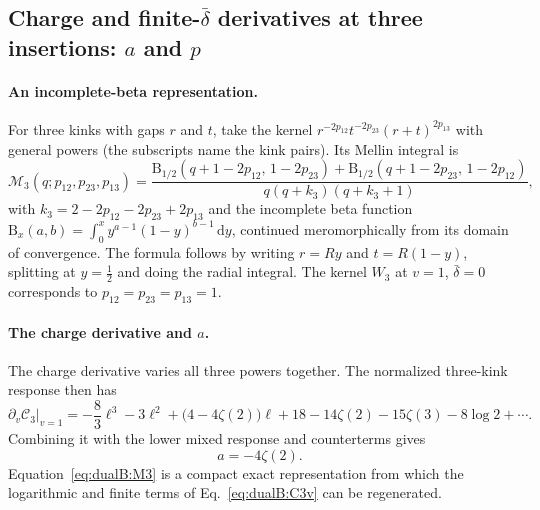 \documentclass[11pt,a4paper]{article}
\numberwithin{equation}{section}
\newcommand{\dd}{\,\mathrm d}
\newcommand{\db}{\bar\delta}
\begin{document}
\subsection{Charge and finite-\texorpdfstring{$\db$}{delta} derivatives at three insertions:
\texorpdfstring{$a$}{a} and \texorpdfstring{$p$}{p}}\label{app:dualB:threeins}
\paragraph{An incomplete-beta representation.} For three kinks with gaps $r$ and $t$, take the kernel
$r^{-2p_{12}}t^{-2p_{23}}(r+t)^{2p_{13}}$ with general powers (the subscripts name the kink pairs). Its Mellin
integral is
\begin{equation}
 \mathcal M_3(q;p_{12},p_{23},p_{13})
 =\frac{\mathrm B_{1/2}(q+1-2p_{12},\,1-2p_{23})+\mathrm B_{1/2}(q+1-2p_{23},\,1-2p_{12})}{q(q+k_3)(q+k_3+1)},
 \label{eq:dualB:M3}
\end{equation}
with $k_3=2-2p_{12}-2p_{23}+2p_{13}$ and the incomplete beta function
$\mathrm B_x(a,b)=\int_0^xy^{a-1}(1-y)^{b-1}\dd y$, continued meromorphically from its domain of convergence. The
formula follows by writing $r=Ry$ and $t=R(1-y)$, splitting at $y=\frac12$ and doing the radial integral. The kernel
$W_3$ at $v=1$, $\db=0$ corresponds to $p_{12}=p_{23}=p_{13}=1$.

\paragraph{The charge derivative and $a$.} The charge derivative varies all three powers together. The normalized
three-kink response then has
\begin{equation}
 \partial_v\mathcal C_3\big|_{v=1}=-\frac83\ell^3-3\ell^2+\bigl(4-4\zeta(2)\bigr)\ell
 +18-14\zeta(2)-15\zeta(3)-8\log2+\cdots.
 \label{eq:dualB:C3v}
\end{equation}
Combining it with the lower mixed response and counterterms gives
\begin{equation}
 a=-4\zeta(2).
\end{equation}
Equation~\eqref{eq:dualB:M3} is a compact exact representation from which the logarithmic and finite terms of
Eq.~\eqref{eq:dualB:C3v} can be regenerated.
\end{document}
